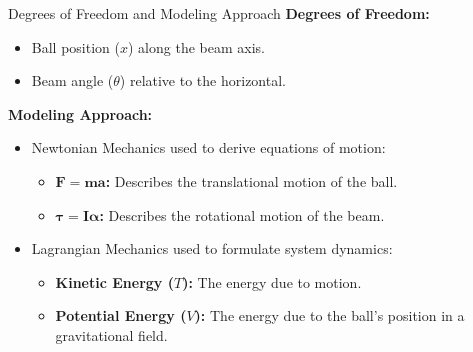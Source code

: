 \documentclass{beamer}
\begin{document}
\begin{frame}{Degrees of Freedom and Modeling Approach}
    \textbf{Degrees of Freedom:}
    \begin{itemize}
        \item Ball position (\(x\)) along the beam axis.
        \item Beam angle (\(\theta\)) relative to the horizontal.
    \end{itemize}

    \vspace{0.2cm}
    \textbf{Modeling Approach:}
    \begin{itemize}
        \item Newtonian Mechanics used to derive equations of motion:
        \begin{itemize}
            \item \textbf{\(\boldsymbol{F = ma}\):} Describes the translational motion of the ball.
            \item \textbf{\(\boldsymbol{\tau = I \alpha}\):} Describes the rotational motion of the beam.
        \end{itemize}
        
        \item Lagrangian Mechanics used to formulate system dynamics:
        \begin{itemize}
            \item \textbf{Kinetic Energy (\(T\)):} The energy due to motion.
            \item \textbf{Potential Energy (\(V\)):} The energy due to the ball’s position in a gravitational field.
        \end{itemize}
    \end{itemize}
\end{frame}
\end{document}
